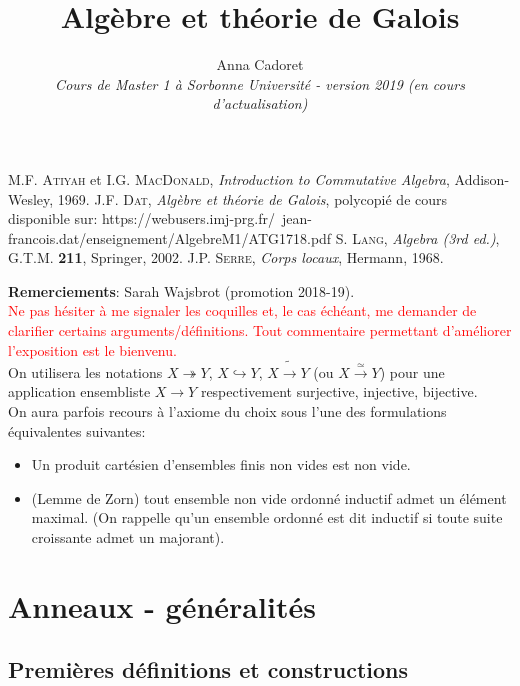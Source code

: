 \documentclass[a4paper, oneside, 12pt]{book}
\title{Algèbre et théorie de Galois}
\author{Anna Cadoret\\
\textit{Cours de Master 1 à Sorbonne Université - version 2019 (en cours d'actualisation)}}
\theoremstyle{definition} %
\begin{document}
\maketitle  
\tableofcontents
 
\begin{thebibliography}{99}
 M.F. \textsc{Atiyah} et I.G. \textsc{MacDonald},
  {\it Introduction to Commutative Algebra}, Addison-Wesley,  1969.
 J.F. \textsc{Dat}, {\it Algèbre et théorie de Galois}, polycopié de cours disponible sur: https://webusers.imj-prg.fr/~jean-francois.dat/enseignement/AlgebreM1/ATG1718.pdf
 S. \textsc{Lang},
  {\it Algebra (3rd ed.)}, G.T.M. \textbf{211}, Springer, 2002.
 J.P. \textsc{Serre},
  {\it Corps locaux}, Hermann, 1968.
\end{thebibliography}

 \textbf{Remerciements}: Sarah Wajsbrot (promotion 2018-19).\\

\textcolor{red}{Ne pas hésiter à me signaler les coquilles et, le cas échéant, me demander de clarifier  certains arguments/définitions. Tout  commentaire permettant d'améliorer l'exposition est le bienvenu.}\\

 On utilisera les notations $X\twoheadrightarrow Y$, $X\hookrightarrow Y$, $X\tilde{\rightarrow} Y$ (ou $X\stackrel{\simeq}{\rightarrow} Y$) pour une application ensembliste $X\rightarrow Y$ respectivement  surjective, injective, bijective.\\

 
  On aura parfois recours à l'axiome du choix sous l'une des formulations équivalentes suivantes:
 \begin{itemize}
 \item Un produit cartésien d'ensembles finis non vides est non vide.
 \item (Lemme de Zorn) tout ensemble non vide ordonné inductif admet un élément maximal. (On rappelle qu'un ensemble ordonné est dit inductif si toute suite croissante admet un majorant).
 \end{itemize}
\part{Anneaux - généralités}

\chapter{Premières définitions et constructions}
\end{document}
